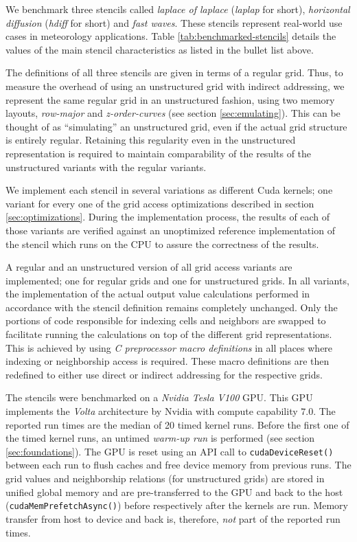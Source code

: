 We benchmark three stencils called \emph{laplace of laplace} (\emph{laplap} for short), \emph{horizontal diffusion} (\emph{hdiff} for short) and \emph{fast waves}. These stencils represent real-world use cases in meteorology applications. Table \ref{tab:benchmarked-stencils} details the values of the main stencil characteristics as listed in the bullet list above.

The definitions of all three stencils are given in terms of a regular grid. Thus, to measure the overhead of using an unstructured grid with indirect addressing, we represent the same regular grid in an unstructured fashion, using two memory layouts, \emph{row-major} and \emph{z-order-curves} (see section \ref{sec:emulating}). This can be thought of as ``simulating'' an unstructured grid, even if the actual grid structure is entirely regular. Retaining this regularity even in the unstructured representation is required to maintain comparability of the results of the unstructured variants with the regular variants.

We implement each stencil in several variations as different Cuda kernels; one variant for every one of the grid access optimizations described in section \ref{sec:optimizations}. During the implementation process, the results of each of those variants are verified against an unoptimized reference implementation of the stencil which runs on the CPU to assure the correctness of the results.

A regular and an unstructured version of all grid access variants are implemented; one for regular grids and one for unstructured grids. In all variants, the implementation of the actual output value calculations performed in accordance with the stencil definition remains completely unchanged. Only the portions of code responsible for indexing cells and neighbors are swapped to facilitate running the calculations on top of the different grid representations. This is achieved by using \emph{C preprocessor macro definitions} in all places where indexing or neighborship access is required. These macro definitions are then redefined to either use direct or indirect addressing for the respective grids.

The stencils were benchmarked on a \emph{Nvidia Tesla V100} GPU. This GPU implements the \emph{Volta} architecture by Nvidia with compute capability $7.0$. The reported run times are the median of 20 timed kernel runs. Before the first one of the timed kernel runs, an untimed \emph{warm-up run} is performed (see section \ref{sec:foundations}). The GPU is reset using an API call to \texttt{cudaDeviceReset()} between each run to flush caches and free device memory from previous runs. The grid values and neighborship relations (for unstructured grids) are stored in unified global memory and are pre-transferred to the GPU and back to the host (\texttt{cudaMemPrefetchAsync()}) before respectively after the kernels are run. Memory transfer from host to device and back is, therefore, \emph{not} part of the reported run times.

